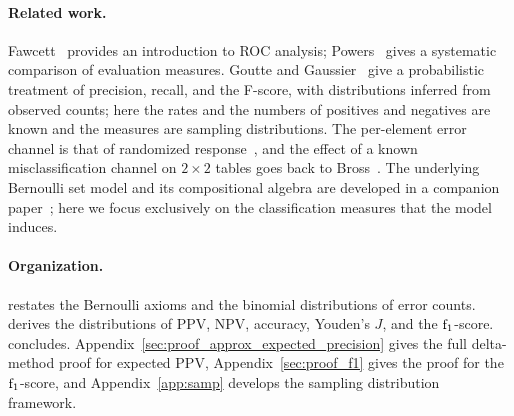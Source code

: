 \paragraph{Related work.}
Fawcett~\cite{fawcettROC} provides an introduction to ROC analysis; Powers~\cite{powersEval} gives a systematic comparison of evaluation measures.
Goutte and Gaussier~\cite{goutte2005probabilistic} give a probabilistic treatment of precision, recall, and the F-score, with distributions inferred from observed counts; here the rates and the numbers of positives and negatives are known and the measures are sampling distributions.
The per-element error channel is that of randomized response~\cite{warner1965randomized}, and the effect of a known misclassification channel on $2 \times 2$ tables goes back to Bross~\cite{bross1954misclassification}.
The underlying Bernoulli set model and its compositional algebra are developed in a companion paper~\cite{bernoulliSets}; here we focus exclusively on the classification measures that the model induces.

\paragraph{Organization.}
 restates the Bernoulli axioms and the binomial distributions of error counts.
 derives the distributions of PPV, NPV, accuracy, Youden's $J$, and the $\mathrm{f}_1$-score.
 concludes.
Appendix~\ref{sec:proof_approx_expected_precision} gives the full delta-method proof for expected PPV, Appendix~\ref{sec:proof_f1} gives the proof for the $\mathrm{f}_1$-score, and Appendix~\ref{app:samp} develops the sampling distribution framework.
